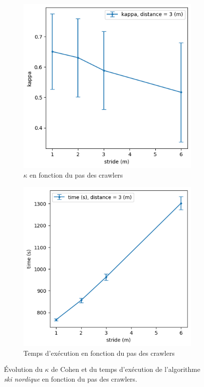 \documentclass[english,RandD]{rapportPFE}  %
\begin{document}
			\begin{figure}[h!]
				\begin{subfigure}[t]{0.49\linewidth}
					\includegraphics[width=\linewidth]{graphics/ski_nordique-kappa_vs_stride.png}
					\caption{$\kappa$ en fonction du pas des crawlers}
					\label{fig:ski_nordique-kappa_vs_stride}
				\end{subfigure}
				\hfill
				\begin{subfigure}[t]{0.49\linewidth}
						\includegraphics[width=\linewidth]{graphics/ski_nordique-time_vs_stride.png}
						\caption{Temps d'exécution en fonction du pas des crawlers}
						\label{fig:ski_nordique-time_vs_stride}
				\end{subfigure}
				\caption{Évolution du $\kappa$ de Cohen et du temps d'exécution de l'algorithme \textit{ski nordique} en fonction du pas des crawlers.}
				\label{fig:ski_nordique-stride}
			\end{figure}
\end{document}
